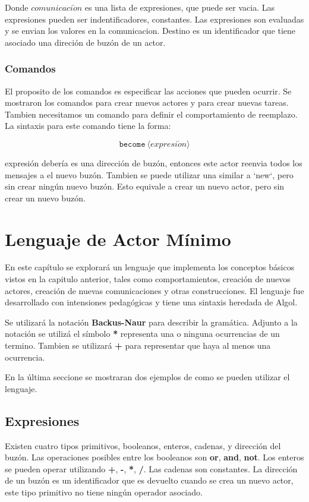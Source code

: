 Donde $comunicaci\acute{o}n$ es una lista de expresiones, que puede ser vacia. Las expresiones pueden ser indentificadores, constantes. Las expresiones son evaluadas y se envian los valores en la comunicacion. Destino es un identificador que tiene asociado una direción de buzón de un actor.

\subsubsection*{Comandos}

El proposito de los comandos es especificar las acciones que pueden ocurrir. Se mostraron los comandos para crear nuevos actores y para crear nuevas tareas. Tambien necesitamos un comando para definir el comportamiento de reemplazo. La sintaxis para este comando tiene la forma:

\[
 \texttt{become}\ \langle expresi\acute{o}n \rangle
\]

expresión debería es una dirección de buzón, entonces este actor reenvia todos los mensajes a el nuevo buzón. Tambien se puede utilizar una similar a `new`, pero sin crear ningún nuevo buzón. Esto equivale a crear un nuevo actor, pero sin crear un nuevo buzón.


\section{Lenguaje de Actor Mínimo}

En este capítulo se explorará un lenguaje que implementa los conceptos básicos vistos en la capitulo anterior, tales como comportamientos, creación de nuevos actores, creación de nuevas comunicaciones y otras construcciones. El lenguaje \SAL fue desarrollado con intensiones pedagógicas y tiene una sintaxis heredada de Algol. 

Se utilizará la notación \textbf{Backus-Naur}\cite{McCracken:2003:BF:1074100.1074155} para describir la gramática. Adjunto a la notación se utilizá el símbolo \textbf{*} representa una o ninguna ocurrencias de un termino. Tambien se utilizará \textbf{+} para representar que haya al menos una ocurrencia.

En la última seccione se mostraran dos ejemplos de como se pueden utilizar el lenguaje.

\subsection{Expresiones}
Existen cuatro tipos primitivos, booleanos, enteros, cadenas, y dirección del buzón. Las operaciones posibles entre los booleanos son \textbf{or}, \textbf{and}, \textbf{not}. Los enteros se pueden operar utilizando \textbf{+}, \textbf{-}, \textbf{*}, \textbf{/}. Las cadenas son constantes. La dirección de un buzón es un identificador que es devuelto cuando se crea un nuevo actor, este tipo primitivo no tiene ningún operador asociado.

